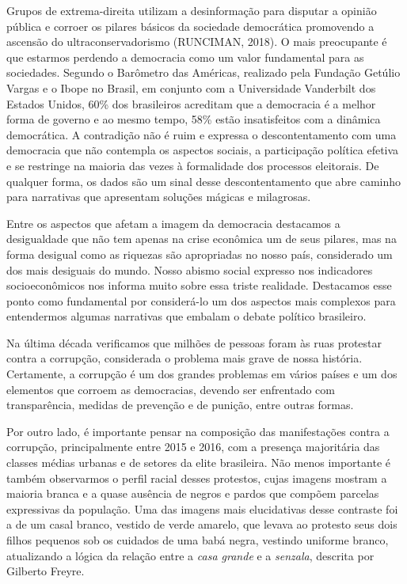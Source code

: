 Grupos de extrema-direita utilizam a desinformação para disputar a
opinião pública e corroer os pilares básicos da sociedade democrática
promovendo a ascensão do ultraconservadorismo (RUNCIMAN, 2018). O mais
preocupante é que estarmos perdendo a democracia como um valor
fundamental para as sociedades. Segundo o Barômetro das Américas,
realizado pela Fundação Getúlio Vargas e o Ibope no Brasil, em conjunto
com a Universidade Vanderbilt dos Estados Unidos, 60\% dos brasileiros
acreditam que a democracia é a melhor forma de governo e ao mesmo tempo,
58\% estão insatisfeitos com a dinâmica democrática. A contradição não é
ruim e expressa o descontentamento com uma democracia que não contempla
os aspectos sociais, a participação política efetiva e se restringe na
maioria das vezes à formalidade dos processos eleitorais. De qualquer
forma, os dados são um sinal desse descontentamento que abre caminho para
narrativas que apresentam soluções mágicas e milagrosas.

Entre os aspectos que afetam a imagem da democracia destacamos a
desigualdade que não tem apenas na crise econômica um de seus pilares,
mas na forma desigual como as riquezas são apropriadas no nosso país,
considerado um dos mais desiguais do mundo. Nosso abismo social expresso
nos indicadores socioeconômicos nos informa muito sobre essa triste
realidade. Destacamos esse ponto como fundamental por considerá-lo um
dos aspectos mais complexos para entendermos algumas narrativas que
embalam o debate político brasileiro.

Na última década verificamos que milhões de pessoas foram às ruas
protestar contra a corrupção, considerada o problema mais grave de nossa
história. Certamente, a corrupção é um dos grandes problemas em vários
países e um dos elementos que corroem as democracias, devendo ser
enfrentado com transparência, medidas de prevenção e de punição, entre
outras formas.

Por outro lado, é importante pensar na composição das manifestações
contra a corrupção, principalmente entre 2015 e 2016, com a presença
majoritária das classes médias urbanas e de setores da elite brasileira.
Não menos importante é também observarmos o perfil racial desses
protestos, cujas imagens mostram a maioria branca e a quase ausência de
negros e pardos que compõem parcelas expressivas da população. Uma das
imagens mais elucidativas desse contraste foi a de um casal branco,
vestido de verde amarelo, que levava ao protesto seus dois filhos
pequenos sob os cuidados de uma babá negra, vestindo uniforme branco,
atualizando a lógica da relação entre a \textit{casa grande} e a \textit{senzala},
descrita por Gilberto Freyre.

